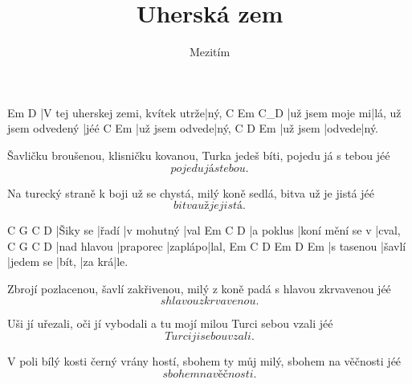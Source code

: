 \documentclass{song}
\title{Uherská zem}
\author{Mezitím}
\begin{document}
\strophe
Em                                D
|V tej uherskej zemi, kvítek utrže|ný,
C               Em                    C_D
|už jsem moje mi|lá, už jsem odvedený |jéé
C              Em
|už jsem odvede|ný,
C        D      Em
|už jsem |odvede|ný.
\endstrophe

\strophe*
Šavličku broušenou, klisničku kovanou,
Turka jedeš bíti, pojedu já s tebou jéé \[ pojedu já s tebou. \]
\endstrophe

\strophe*
Na turecký straně k boji už se chystá,
milý koně sedlá, bitva už je jistá jéé \[ bitva už je jistá. \]
\endstrophe

C        G     C          D
|Šiky se |řadí |v mohutný |val
Em        C               D
|a poklus |koní mění se v |cval,
C           G         C       D
|nad hlavou |praporec |zaplápo|lal,
Em         C      D         Em    D      Em
|s tasenou |šavlí |jedem se |bít, |za krá|le.
\endstrophe

\strophe*
Zbrojí pozlacenou, šavlí zakřivenou, milý z koně padá
s hlavou zkrvavenou jéé \[ s hlavou zkrvavenou. \]
\endstrophe

\strophe*
Uši jí uřezali, oči jí vybodali
a tu mojí milou Turci sebou vzali jéé \[ Turci ji sebou vzali. \]
\endstrophe

\strophe*
V poli bílý kosti černý vrány hostí,
sbohem ty můj milý, sbohem na věčnosti jéé \[ sbohem na věčnosti. \]
\endstrophe
\end{document}

